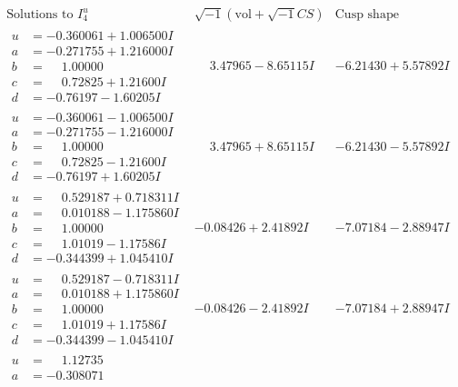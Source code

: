 \documentclass[1p]{elsarticle_modified}
\theoremstyle{definition}
\newcommand{\I}{\sqrt{-1}}
\begin{document}
$$\begin{array}{c|c|c}  
\text{Solutions to }I^u_{4}& \I (\text{vol} + \sqrt{-1}CS) & \text{Cusp shape}\\
 \hline 
\begin{aligned}
u &= -0.360061 + 1.006500 I \\
a &= -0.271755 + 1.216000 I \\
b &= \phantom{-}1.00000\phantom{ +0.000000I} \\
c &= \phantom{-}0.72825 + 1.21600 I \\
d &= -0.76197 - 1.60205 I\end{aligned}
 & \phantom{-}3.47965 - 8.65115 I & -6.21430 + 5.57892 I \\ \hline\begin{aligned}
u &= -0.360061 - 1.006500 I \\
a &= -0.271755 - 1.216000 I \\
b &= \phantom{-}1.00000\phantom{ +0.000000I} \\
c &= \phantom{-}0.72825 - 1.21600 I \\
d &= -0.76197 + 1.60205 I\end{aligned}
 & \phantom{-}3.47965 + 8.65115 I & -6.21430 - 5.57892 I \\ \hline\begin{aligned}
u &= \phantom{-}0.529187 + 0.718311 I \\
a &= \phantom{-}0.010188 - 1.175860 I \\
b &= \phantom{-}1.00000\phantom{ +0.000000I} \\
c &= \phantom{-}1.01019 - 1.17586 I \\
d &= -0.344399 + 1.045410 I\end{aligned}
 & -0.08426 + 2.41892 I & -7.07184 - 2.88947 I \\ \hline\begin{aligned}
u &= \phantom{-}0.529187 - 0.718311 I \\
a &= \phantom{-}0.010188 + 1.175860 I \\
b &= \phantom{-}1.00000\phantom{ +0.000000I} \\
c &= \phantom{-}1.01019 + 1.17586 I \\
d &= -0.344399 - 1.045410 I\end{aligned}
 & -0.08426 - 2.41892 I & -7.07184 + 2.88947 I \\ \hline\begin{aligned}
u &= \phantom{-}1.12735\phantom{ +0.000000I} \\
a &= -0.308071\phantom{ +0.000000I} \\

\end{aligned}
\end{array}$$
\end{document}
